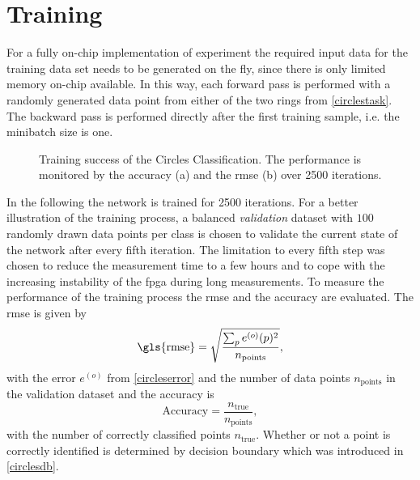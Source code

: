 \section{Training}
For a fully on-chip implementation of experiment the required input data for the training data set needs to be generated on the fly, since there is only limited memory on-chip available. In this way, each forward pass is performed with a randomly generated data point from either of the two rings from \cref{circlestask}. The backward pass is performed directly after the first training sample, i.e. the minibatch size is one.

\begin{figure}
	\begin{center}
		
	\end{center}
	\caption[Training success of the Circles Classification.]{Training success of the Circles Classification. The performance is monitored by the accuracy (a) and the \acrfull{rmse} (b) over 2500 iterations.}
	\label{circles_acc}
\end{figure}

In the following the network is trained for 2500 iterations. For a better illustration of the training process, a balanced \emph{validation} dataset with $100$ randomly drawn data points per class is chosen to validate the current state of the network after every fifth iteration. The limitation to every fifth step was chosen to reduce the measurement time to a few hours and to cope with the increasing instability of the \gls{fpga} during long measurements. To measure the performance of the training process the \gls{rmse} and the accuracy are evaluated. The \gls{rmse} is given by
\begin{equation}
\text{\gls{rmse}} = \sqrt{\frac{\sum_p e^{(o)}(p)^2}{n_\text{points}}},
\end{equation}
with the error $e^{(o)}$ from \cref{circleserror} and the number of data points $n_\text{points}$ in the validation dataset and the accuracy is
\begin{equation}
\text{Accuracy} = \frac{n_\text{true}}{n_\text{points}},
\end{equation}
with the number of correctly classified points $n_\text{true}$. Whether or not a point is correctly identified is determined by decision boundary which was introduced in \cref{circlesdb}.

%	

